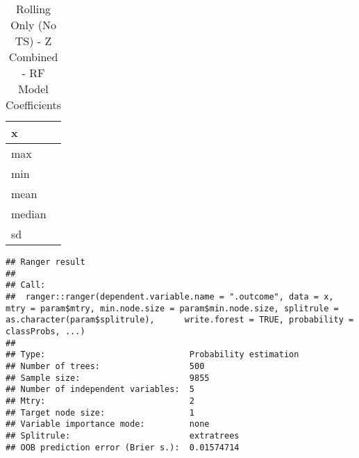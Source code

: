 \documentclass[]{article}
\begin{document}
\begin{table}[!h]

\caption{\label{tab:sensor-z-combined-rolling-only-no-ts-rf-params}Rolling Only (No TS) - Z Combined - RF Model Coefficients}
\centering
\begin{tabular}[t]{l}
\toprule
x\\
\midrule
max\\
min\\
mean\\
median\\
sd\\
\bottomrule
\end{tabular}
\end{table}

\begin{verbatim}
## Ranger result
## 
## Call:
##  ranger::ranger(dependent.variable.name = ".outcome", data = x,      mtry = param$mtry, min.node.size = param$min.node.size, splitrule = as.character(param$splitrule),      write.forest = TRUE, probability = classProbs, ...) 
## 
## Type:                             Probability estimation 
## Number of trees:                  500 
## Sample size:                      9855 
## Number of independent variables:  5 
## Mtry:                             2 
## Target node size:                 1 
## Variable importance mode:         none 
## Splitrule:                        extratrees 
## OOB prediction error (Brier s.):  0.01574714
\end{verbatim}
\end{document}
